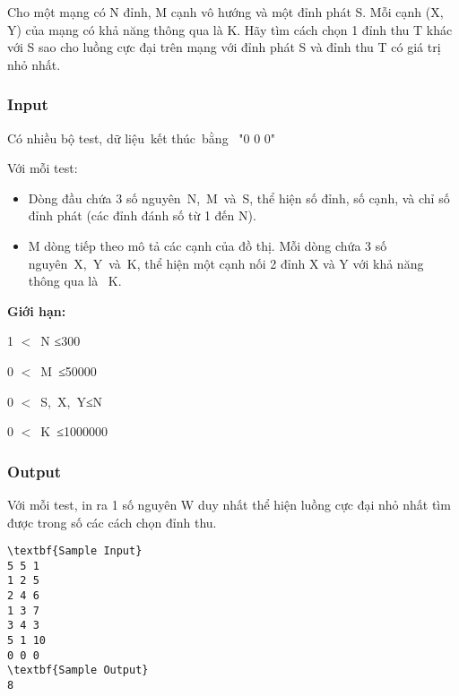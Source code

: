 

Cho một mạng có N đỉnh, M cạnh vô hướng và một đỉnh phát S. Mỗi cạnh (X, Y) của mạng có khả năng thông qua là K. Hãy tìm cách chọn 1 đỉnh thu T khác với S sao cho luồng cực đại trên mạng với đỉnh phát S và đỉnh thu T có giá trị nhỏ nhất.

\subsubsection{Input}

Có nhiều bộ test, dữ liệu kết thúc bằng  "0 0 0"

Với mỗi test:
\begin{itemize}
	\item Dòng đầu chứa 3 số nguyên N, M và S, thể hiện số đỉnh, số cạnh, và chỉ số đỉnh phát (các đỉnh đánh số từ 1 đến N).
	\item M dòng tiếp theo mô tả các cạnh của đồ thị. Mỗi dòng chứa 3 số nguyên X, Y và K, thể hiện một cạnh nối 2 đỉnh X và Y với khả năng thông qua là  K.
\end{itemize}

\textbf{Giới hạn:}

1 $<$ N ≤300

0 $<$ M ≤50000

0 $<$ S, X, Y≤N

0 $<$ K ≤1000000

\subsubsection{Output}

Với mỗi test, in ra 1 số nguyên W duy nhất thể hiện luồng cực đại nhỏ nhất tìm được trong số các cách chọn đỉnh thu.
\begin{verbatim}
\textbf{Sample Input}
5 5 1 
1 2 5 
2 4 6 
1 3 7 
3 4 3 
5 1 10 
0 0 0
\textbf{Sample Output}
8
\end{verbatim}
